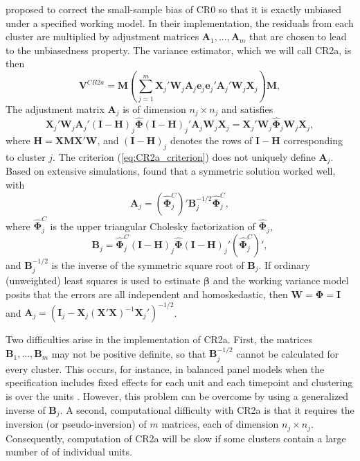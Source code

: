 \documentclass[12pt]{article}\usepackage[]{graphicx}\usepackage[]{color}
\newcommand{\bm}{\mathbf}
\newcommand{\bs}{\boldsymbol}
\begin{document}
\citet[see also \citealp{Bell2002bias}]{McCaffrey2001generalizations} proposed to correct the small-sample bias of CR0 so that it is exactly unbiased under a specified working model. 
In their implementation, the residuals from each cluster are multiplied by adjustment matrices $\bm{A}_1,...,\bm{A}_m$ that are chosen to lead to the unbiasedness property. 
The variance estimator, which we will call CR2a, is then 
\begin{equation}
\label{eq:V_CR2a}
\bm{V}^{CR2a} = \bm{M}\left(\sum_{j=1}^m \bm{X}_j'\bm{W}_j \bm{A}_j \bm{e}_j \bm{e}_j' \bm{A}_j' \bm{W}_j \bm{X}_j\right) \bm{M},
\end{equation}
The adjustment matrix $\bm{A}_j$ is of dimension $n_j \times n_j$ and satisfies
\begin{equation}
\label{eq:CR2a_criterion}
\bm{X}_j' \bm{W}_j \bm{A}_j' \left(\bm{I} - \bm{H}\right)_j \hat{\bs\Phi} \left(\bm{I} - \bm{H}\right)_j' \bm{A}_j \bm{W}_j \bm{X}_j = \bm{X}_j' \bm{W}_j \hat{\bs\Phi}_j \bm{W}_j \bm{X}_j,
\end{equation}
where $\bm{H} = \bm{X}\bm{M}\bm{X}'\bm{W}$, and $\left(\bm{I} - \bm{H}\right)_j$ denotes the rows of $\bm{I} - \bm{H}$ corresponding to cluster $j$. 
The criterion (\ref{eq:CR2a_criterion}) does not uniquely define $\bm{A}_j$. 
Based on extensive simulations, \citet{McCaffrey2001generalizations} found that a symmetric solution worked well, with 
\begin{equation}
\label{eq:CR2a_adjustment}
\bm{A}_j = \left(\hat{\bs\Phi}_j^C\right)' \bm{B}_j^{-1/2}\hat{\bs\Phi}_j^C,
\end{equation}
where $\hat{\bs\Phi}_j^C$ is the upper triangular Cholesky factorization of $\hat{\bs\Phi}_j$, 
\begin{equation}
\label{eq:CR2a_Bmatrix}
\bm{B}_j = \hat{\bs\Phi}_j^C\left(\bm{I} - \bm{H}\right)_j \hat{\bs\Phi} \left(\bm{I} - \bm{H}\right)_j' \left(\hat{\bs\Phi}_j^C\right)',
\end{equation}
and $\bm{B}_j^{-1/2}$ is the inverse of the symmetric square root of $\bm{B}_j $. 
If ordinary (unweighted) least squares is used to estimate $\bs\beta$ and the working variance model posits that the errors are all independent and homoskedastic, then $\bm{W} = \bs\Phi = \bm{I}$ and $\bm{A}_j = \left(\bm{I}_j - \bm{X}_j\left(\bm{X}'\bm{X}\right)^{-1}\bm{X}_j'\right)^{-1/2}$.

Two difficulties arise in the implementation of CR2a.
First, the matrices $\bm{B}_1,...,\bm{B}_m$ may not be positive definite, so that $\bm{B}_j^{-1/2}$ cannot be calculated for every cluster. 
This occurs, for instance, in balanced panel models when the specification includes fixed effects for each unit and each timepoint and clustering is over the units \citep[p. 320]{Angrist2009mostly}. 
However, this problem can be overcome by using a generalized inverse of $\bm{B}_j$. 
A second, computational difficulty with CR2a is that it requires the inversion (or pseudo-inversion) of $m$ matrices, each of dimension $n_j \times n_j$. 
Consequently, computation of CR2a will be slow if some clusters contain a large number of of individual units. 
\end{document}
